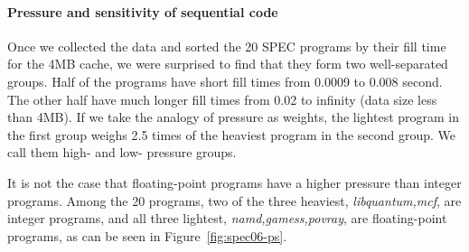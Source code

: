\paragraph{Pressure and sensitivity of sequential code}

Once we collected the data and sorted the 20 SPEC programs by their fill
time for the 4MB cache, we were surprised to find that they form two
well-separated groups.  Half of the programs have short fill times
from 0.0009 to 0.008 second.  The other half have much longer fill
times from 0.02 to infinity (data size less than 4MB).  If we take the
analogy of pressure as weights, the lightest program in the first
group weighs 2.5 times of the heaviest program in the second group.
We call them high- and low- pressure groups.

It is not the case that floating-point programs have a higher pressure
than integer programs.  Among the 20 programs, two of the three
heaviest, \emph{libquantum,mcf}, are integer programs, and all three
lightest, \emph{namd,gamess,povray}, are floating-point programs,
as can be seen in Figure~\ref{fig:spec06-ps}.

